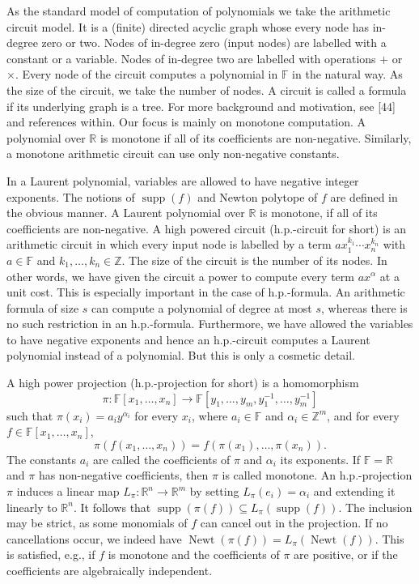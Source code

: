 \documentclass[10pt,a4paper]{article}
\newcommand{\supp}{\operatorname{supp}}
\newcommand{\Newt}{\operatorname{Newt}}
\begin{document}
As the standard model of computation of polynomials we take the arithmetic circuit model. It is a (finite) directed acyclic graph whose every node has in-degree zero or two. Nodes of in-degree zero (input nodes) are labelled with a constant or a variable. Nodes of in-degree two are labelled with operations $+$ or $\times$. Every node of the circuit computes a polynomial in $\mathbb F$ in the natural way. As the size of the circuit, we take the number of nodes. A circuit is called a formula if its underlying graph is a tree. For more background and motivation, see [44] and references within.
Our focus is mainly on monotone computation. A polynomial over $\mathbb R$ is monotone if all of its coefficients are non-negative. Similarly, a monotone arithmetic circuit can use only non-negative constants.

In a Laurent polynomial, variables are allowed to have negative integer exponents. The notions of $\supp(f)$ and Newton polytope of $f$ are defined in the obvious manner. A Laurent polynomial over $\mathbb R$ is monotone, if all of its coefficients are non-negative.
A high powered circuit (h.p.-circuit for short) is an arithmetic circuit in which every input node is labelled by a term $ax_1^{k_1}\cdots x_n^{k_n}$ with $a\in\mathbb F$ and $k_1,\ldots,k_n\in\mathbb Z$. The size of the circuit is the number of its nodes.
In other words, we have given the circuit a power to compute every term $ax^\alpha$ at a unit cost. This is especially important in the case of h.p.-formula. An arithmetic formula of size $s$ can compute a polynomial of degree at most $s$, whereas there is no such restriction in an h.p.-formula. Furthermore, we have allowed the variables to have negative exponents and hence an h.p.-circuit computes a Laurent polynomial instead of a polynomial. But this is only a cosmetic detail.

A high power projection (h.p.-projection for short) is a homomorphism
\[\pi:\mathbb F[x_1,\ldots,x_n]\to\mathbb F[y_1,\ldots,y_m,y_1^{-1},\ldots,y_m^{-1}]\]
such that $\pi(x_i)=a_i y^{\alpha_i}$ for every $x_i$, where $a_i\in\mathbb F$ and $\alpha_i\in\mathbb Z^m$, and for every $f\in\mathbb F[x_1,\ldots,x_n]$,
\[\pi(f(x_1,\ldots,x_n))=f(\pi(x_1),\ldots,\pi(x_n)).\]
The constants $a_i$ are called the coefficients of $\pi$ and $\alpha_i$ its exponents. If $\mathbb F=\mathbb R$ and $\pi$ has non-negative coefficients, then $\pi$ is called monotone.
An h.p.-projection $\pi$ induces a linear map $L_\pi:\mathbb R^n\to\mathbb R^m$ by setting $L_\pi(e_i)=\alpha_i$ and extending it linearly to $\mathbb R^n$. It follows that $\supp(\pi(f))\subseteq L_\pi(\supp(f))$. The inclusion may be strict, as some monomials of $f$ can cancel out in the projection. If no cancellations occur, we indeed have $\Newt(\pi(f))=L_\pi(\Newt(f))$. This is satisfied, e.g., if $f$ is monotone and the coefficients of $\pi$ are positive, or if the coefficients are algebraically independent.
\end{document}
